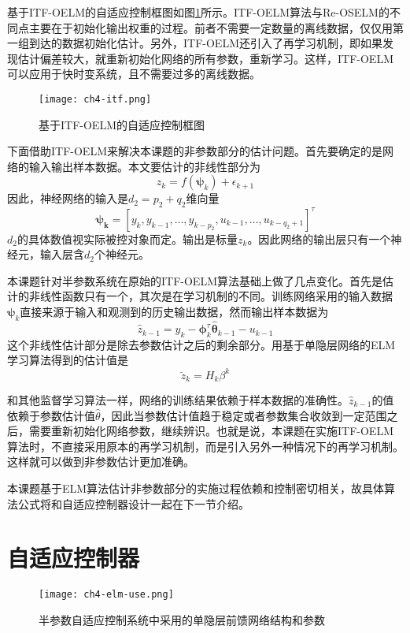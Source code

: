 基于ITF-OELM的自适应控制框图如图\ref{fig.itf-oelm}所示。ITF-OELM算法与Re-OSELM的不同点主要在于初始化输出权重的过程。前者不需要一定数量的离线数据，仅仅用第一组到达的数据初始化估计。另外，ITF-OELM还引入了再学习机制，即如果发现估计偏差较大，就重新初始化网络的所有参数，重新学习。这样，ITF-OELM可以应用于快时变系统，且不需要过多的离线数据。
\begin{figure}[!htb]
  \centering
  \texttt{[image: ch4-itf.png]}\\	 %
  \caption{基于ITF-OELM的自适应控制框图}
  \label{fig.itf-oelm}
\end{figure}

下面借助ITF-OELM来解决本课题的非参数部分的估计问题。首先要确定的是网络的输入输出样本数据。本文要估计的非线性部分为
\begin{equation}
z_{k} = f(\bm{\psi}_{k}) + \epsilon_{k+1}
\end{equation}
因此，神经网络的输入是$d_{2}=p_{2}+q_{2}$维向量
$$\bm{\psi_{k}}=[y_{k},y_{k-1},\ldots,y_{k-p_{2}},u_{k-1},\dots,u_{k-q_{2}+1}]^{\tau}$$
$d_{2}$的具体数值视实际被控对象而定。输出是标量$z_{k}$。因此网络的输出层只有一个神经元，输入层含$d_{2}$个神经元。

本课题针对半参数系统在原始的ITF-OELM算法基础上做了几点变化。首先是估计的非线性函数只有一个，其次是在学习机制的不同。训练网络采用的输入数据$\bm{\psi}_{k}$直接来源于输入和观测到的历史输出数据，然而输出样本数据为
\begin{equation}\label{eq:4.hatz}
\hat{z}_{k-1}=y_{k}-\bm{\phi}_{k}^{\tau}\hat{\bm{\theta}}_{k-1}-u_{k-1}
\end{equation}
这个非线性估计部分是除去参数估计之后的剩余部分。用基于单隐层网络的ELM学习算法得到的估计值是
\begin{equation}\label{eq:4.z.breave}
\breve{z}_{k}=H_{k}\beta^{k}
\end{equation}

和其他监督学习算法一样，网络的训练结果依赖于样本数据的准确性。$\hat{z}_{k-1}$的值依赖于参数估计值$\hat{\theta}$，因此当参数估计值趋于稳定或者参数集合收敛到一定范围之后，需要重新初始化网络参数，继续辨识。也就是说，本课题在实施ITF-OELM算法时，不直接采用原本的再学习机制，而是引入另外一种情况下的再学习机制。这样就可以做到非参数估计更加准确。

本课题基于ELM算法估计非参数部分的实施过程依赖和控制密切相关，故具体算法公式将和自适应控制器设计一起在下一节介绍。

\section{自适应控制器}\label{sect:4.3}
\begin{figure}[!htb]
  \centering
  \texttt{[image: ch4-elm-use.png]}\\	 %
  \caption{半参数自适应控制系统中采用的单隐层前馈网络结构和参数}
  \label{fig.elm.use}
\end{figure}

